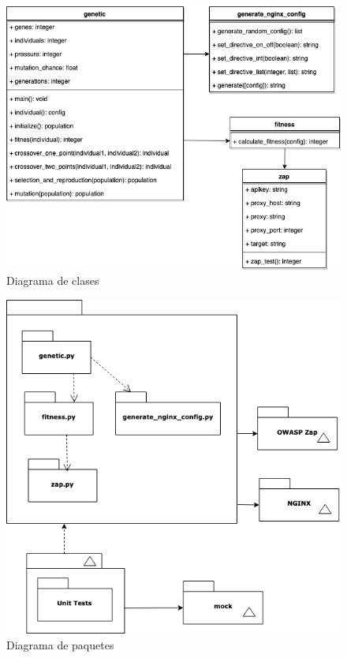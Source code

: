 \begin{figure}[H]
\centering
\includegraphics[width=1.0\textwidth]{../images/diagrama_1}
\caption{Diagrama de clases}
\label{fig:diagrama_1}
\end{figure}

\begin{figure}[H]
\centering
\includegraphics[width=1.0\textwidth]{../images/diagrama_2}
\caption{Diagrama de paquetes}
\label{fig:diagrama_2}
\end{figure}

